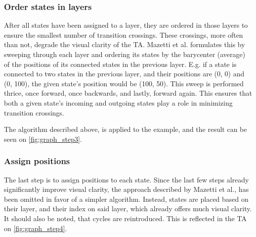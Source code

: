 \subsubsection{Order states in layers}
After all states have been assigned to a layer, they are ordered in those layers to ensure the smallest number of transition crossings. These crossings, more often than not, degrade the visual clarity of the TA.
Mazetti et al. formulates this by sweeping through each layer and ordering its states by the barycenter (average) of the positions of its connected states in the previous layer.
E.g. if a state is connected to two states in the previous layer, and their positions are (0, 0) and (0, 100), the given state's position would be (100, 50).
This sweep is performed thrice, once forward, once backwards, and lastly, forward again.
This ensures that both a given state's incoming and outgoing states play a role in minimizing transition crossings. \cite{Mazetti2012}

The algorithm described above, is applied to the example, and the result can be seen on \cref{fig:graph_step3}.
\begin{center}
    
\end{center}

\subsubsection{Assign positions}
The last step is to assign positions to each state.
Since the last few steps already significantly improve visual clarity, the approach described by Mazetti et al., has been omitted in favor of a simpler algorithm. Instead, states are placed based on their layer, and their index on said layer, which already offers much visual clarity. It should also be noted, that cycles are reintroduced. This is reflected in the TA on \cref{fig:graph_step4}.

\begin{center}
    
\end{center}
